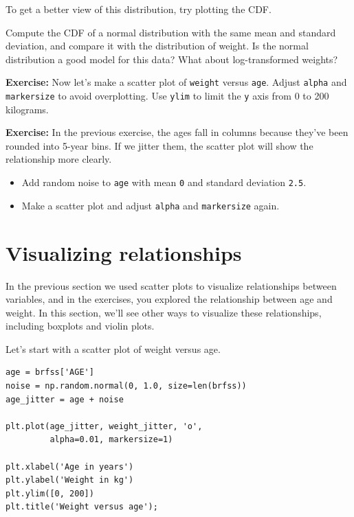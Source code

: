 To get a better view of this distribution, try plotting the CDF.

Compute the CDF of a normal distribution with the same mean and standard
deviation, and compare it with the distribution of weight. Is the normal
distribution a good model for this data? What about log-transformed
weights?

\textbf{Exercise:} Now let's make a scatter plot of
\passthrough{\lstinline!weight!} versus \passthrough{\lstinline!age!}.
Adjust \passthrough{\lstinline!alpha!} and
\passthrough{\lstinline!markersize!} to avoid overplotting. Use
\passthrough{\lstinline!ylim!} to limit the \passthrough{\lstinline!y!}
axis from 0 to 200 kilograms.

\textbf{Exercise:} In the previous exercise, the ages fall in columns
because they've been rounded into 5-year bins. If we jitter them, the
scatter plot will show the relationship more clearly.

\begin{itemize}

\item
  Add random noise to \passthrough{\lstinline!age!} with mean
  \passthrough{\lstinline!0!} and standard deviation
  \passthrough{\lstinline!2.5!}.
\item
  Make a scatter plot and adjust \passthrough{\lstinline!alpha!} and
  \passthrough{\lstinline!markersize!} again.
\end{itemize}

\hypertarget{visualizing-relationships}{%
\section{Visualizing relationships}\label{visualizing-relationships}}

In the previous section we used scatter plots to visualize relationships
between variables, and in the exercises, you explored the relationship
between age and weight. In this section, we'll see other ways to
visualize these relationships, including boxplots and violin plots.

Let's start with a scatter plot of weight versus age.

\begin{lstlisting}[]
age = brfss['AGE']
noise = np.random.normal(0, 1.0, size=len(brfss))
age_jitter = age + noise

plt.plot(age_jitter, weight_jitter, 'o', 
         alpha=0.01, markersize=1)

plt.xlabel('Age in years')
plt.ylabel('Weight in kg')
plt.ylim([0, 200])
plt.title('Weight versus age');
\end{lstlisting}

